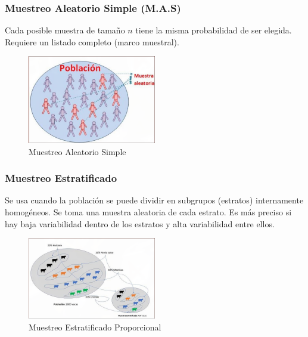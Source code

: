\documentclass[12pt, letterpaper]{article}
\begin{document}
\subsubsection{Muestreo Aleatorio Simple (M.A.S)}
Cada posible muestra de tamaño $n$ tiene la misma probabilidad de ser elegida. Requiere un listado completo (marco muestral).
\begin{figure}[htbp]
	\centering
	\includegraphics[width=0.5\textwidth]{MAS}
	\caption{Muestreo Aleatorio Simple}
	\label{fig:MAS}
\end{figure}


\subsubsection{Muestreo Estratificado}
Se usa cuando la población se puede dividir en subgrupos (estratos) internamente homogéneos. Se toma una muestra aleatoria de cada estrato. Es más preciso si hay baja variabilidad dentro de los estratos y alta variabilidad entre ellos.
\begin{figure}[htbp]
	\centering
	\includegraphics[width=0.5\textwidth]{MEP}
	\caption{Muestreo Estratificado Proporcional}
	\label{fig:MEP}
\end{figure}
\end{document}

